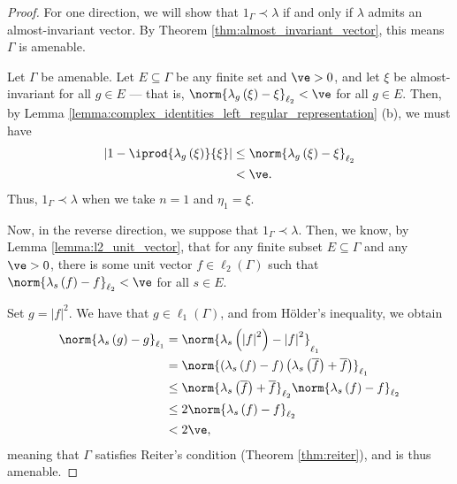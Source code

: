 \begin{proof}
  For one direction, we will show that $1_{\Gamma}\prec \lambda$ if and only if $\lambda$ admits an almost-invariant vector. By Theorem \ref{thm:almost_invariant_vector}, this means $\Gamma$ is amenable.\newline

  Let $\Gamma$ be amenable. Let $E\subseteq \Gamma$ be any finite set and $\ve > 0$, and let $\xi$ be almost-invariant for all $g\in E$ --- that is, $\norm{\lambda_g\left( \xi \right) - \xi}_{\ell_2} < \ve$ for all $g\in E$. Then, by Lemma \ref{lemma:complex_identities_left_regular_representation} (b), we must have
  \begin{align*}
    \left\vert 1 - \iprod{\lambda_g\left( \xi \right)}{\xi} \right\vert &\leq \norm{\lambda_g\left( \xi \right) - \xi}_{\ell_2}\\
    &< \ve.
  \end{align*}
  Thus, $1_{\Gamma}\prec \lambda$ when we take $n = 1$ and $\eta_1 = \xi$.\newline

  Now, in the reverse direction, we suppose that $1_{\Gamma}\prec \lambda$. Then, we know, by Lemma \ref{lemma:l2_unit_vector}, that for any finite subset $E\subseteq \Gamma$ and any $\ve > 0$, there is some unit vector $f\in \ell_2\left( \Gamma \right)$ such that $\norm{\lambda_s\left( f \right) - f}_{\ell_2} < \ve$ for all $s\in E$.\newline

  Set $g = \left\vert f \right\vert^2$. We have that $g\in \ell_1\left( \Gamma \right)$, and from Hölder's inequality, we obtain
  \begin{align*}
    \norm{\lambda_s\left( g \right) - g}_{\ell_1} &= \norm{\lambda_s\left( \left\vert f \right\vert^2 \right) - \left\vert f \right\vert^2}_{\ell_1}\\
                                                  &= \norm{\left( \lambda_s\left( f \right) - f \right)\left( \lambda_s\left( \overline{f} \right) + \overline{f} \right)}_{\ell_1}\\
                                                  &\leq \norm{\lambda_s\left( \overline{f} \right) + \overline{f}}_{\ell_2}\norm{\lambda_s\left( f \right) - f}_{\ell_2}\\
                                                  &\leq 2\norm{\lambda_s\left( f \right) - f}_{\ell_2}\\
                                                  & < 2\ve,
  \end{align*}
  meaning that $\Gamma$ satisfies Reiter's condition (Theorem \ref{thm:reiter}), and is thus amenable.
\end{proof}
